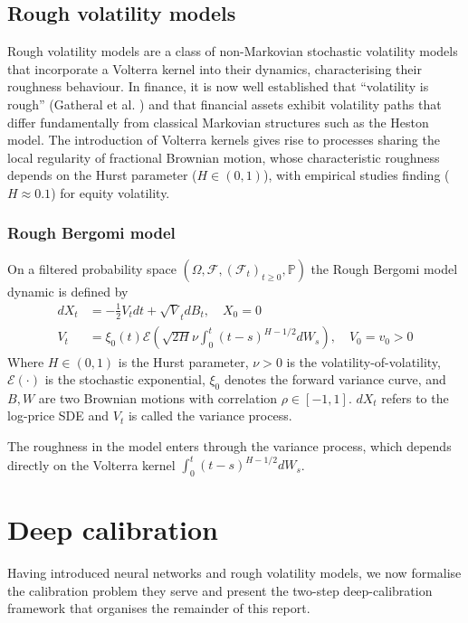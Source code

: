 \documentclass[12pt,a4paper]{article}
\theoremstyle{remark} \newtheorem{remark}[theorem]{Remark}
\begin{document}
\subsection{Rough volatility models}
Rough volatility models are a class of non-Markovian stochastic volatility models that incorporate a Volterra kernel into their dynamics, characterising their roughness behaviour. In finance, it is now well established that ``volatility is rough'' (Gatheral et al. \cite{gatheral}) and that financial assets exhibit volatility paths that differ fundamentally from classical Markovian structures such as the Heston model. The introduction of Volterra kernels gives rise to processes sharing the local regularity of fractional Brownian motion, whose characteristic roughness depends on the Hurst parameter ($H \in (0,1)$), with empirical studies finding ($H \approx 0.1$) for equity volatility.
\subsubsection{Rough Bergomi model}
\begin{definition}
    On a filtered probability space $(\Omega, \mathcal F,(\mathcal F_t)_{t\geq 0}, \mathbb P)$ the Rough Bergomi model dynamic is defined by 
    \begin{align}
        dX_t&=-\frac{1}{2}V_tdt+\sqrt V_t dB_t, \quad X_0=0\label{logprice}\\
        V_t&= \xi_0(t)  \mathcal E(\sqrt{2H}\nu\int_0^t(t-s)^{H-1/2}dW_s ), \quad V_0=v_0>0\label{var rb}
    \end{align}
    Where $H\in (0,1)$ is the Hurst parameter, $\nu>0$ is the volatility-of-volatility, $\mathcal E(\cdot)$ is the stochastic exponential, $\xi_0$ denotes the forward variance curve, and $B, W$ are two Brownian motions with correlation $\rho\in[-1,1]$. $dX_t$ refers to the log-price SDE and $V_t$ is called the variance process.
        
\end{definition}
\noindent The roughness in the model enters through the variance process, which depends directly on the Volterra kernel $\displaystyle \int_0^t(t-s)^{H-1/2}dW_s$.


\section{Deep calibration}\label{deep calibration chapter}
Having introduced neural networks and rough volatility models, we now formalise the calibration problem they serve and present the two-step deep-calibration framework that organises the remainder of this report.
\end{document}
